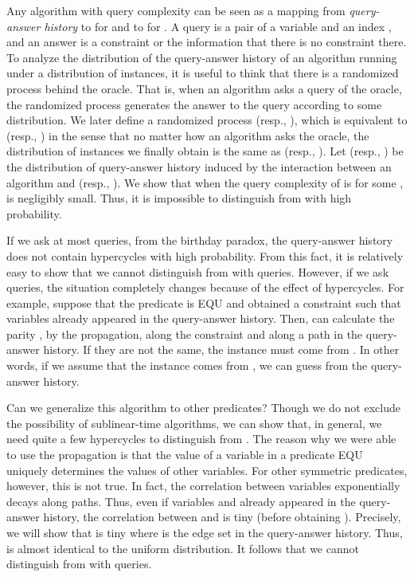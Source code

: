 \documentclass[letterpaper,11pt]{article}
\newcommand{\equ}{\textsf{EQU}\xspace}
\begin{document}
Any algorithm with query complexity  can be seen as a mapping from \textit{query-answer history}  to  for  and to  for .
A query  is a pair of a variable  and an index , and an answer  is a constraint or the information that there is no constraint there.
To analyze the distribution of the query-answer history of an algorithm running under a distribution of instances,
it is useful to think that there is a randomized process behind the oracle.
That is, when an algorithm asks a query of the oracle, 
the randomized process generates the answer to the query according to some distribution.
We later define a randomized process  (resp., ),
which is equivalent to  (resp., ) in the sense that no matter how an algorithm asks the oracle,
the distribution of instances we finally obtain is the same as  (resp., ).
Let  (resp., ) be the distribution of query-answer history induced by the interaction between an algorithm  and  (resp., ).
We show that when the query complexity of  is  for some ,
 is negligibly small.
Thus, it is impossible to distinguish  from  with high probability.

If we ask at most  queries, 
from the birthday paradox,
the query-answer history does not contain hypercycles with high probability.
From this fact, it is relatively easy to show that we cannot distinguish  from  with  queries.
However, if we ask  queries,
the situation completely changes because of the effect of hypercycles.
For example, suppose that the predicate is \equ and  obtained a constraint  such that variables  already appeared in the query-answer history.
Then,  can calculate the parity , by the propagation, along the constraint  and along a path in the query-answer history.
If they are not the same, the instance must come from .
In other words, if we assume that the instance comes from ,  
we can guess  from the query-answer history.

Can we generalize this algorithm to other predicates?
Though we do not exclude the possibility of sublinear-time algorithms,
we can show that, in general, we need quite a few hypercycles to distinguish  from .
The reason why we were able to use the propagation is that the value of a variable in a predicate \equ uniquely determines the values of other variables.
For other symmetric predicates, however, this is not true.
In fact, the correlation between variables exponentially decays along paths.
Thus, even if variables  and  already appeared in the query-answer history,
the correlation between  and  is tiny (before obtaining ).
Precisely, 
we will show that  is tiny where  is the edge set in the query-answer history.
Thus,  is almost identical to the uniform distribution.
It follows that we cannot distinguish  from  with  queries.
\end{document}
